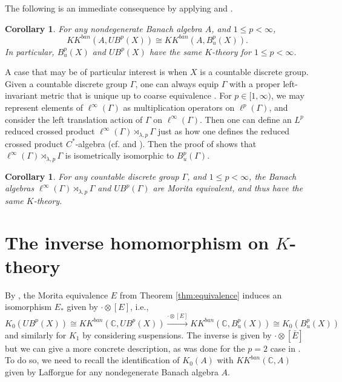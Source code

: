 \documentclass[a4,11pt]{amsart}
\newtheorem{cor}[thm]{Corollary}
\theoremstyle{remark}
\begin{document}
The following is an immediate consequence by applying \cite[Theorem 5.29]{Par09} and \cite[Th\'{e}or\`{e}me 1.2.8]{Laf02}.

\begin{cor} \label{cor:K}
For any nondegenerate Banach algebra $A$, and $1\leq p<\infty$, \[ KK^{ban}(A,UB^p(X))\cong KK^{ban}(A,B^p_u(X)). \]
In particular, $B^p_u(X)$ and $UB^p(X)$ have the same $K$-theory for $1\leq p<\infty$. 
\end{cor}

A case that may be of particular interest is when $X$ is a countable discrete group.
Given a countable discrete group $\Gamma$, one can always equip $\Gamma$ with a proper left-invariant metric that is unique up to coarse equivalence \cite[Lemma 2.1]{Tu01}.
For $p\in[1,\infty)$, we may represent elements of $\ell^\infty(\Gamma)$ as multiplication operators on $\ell^p(\Gamma)$, and consider the left translation action of $\Gamma$ on $\ell^\infty(\Gamma)$. Then one can define an $L^p$ reduced crossed product $\ell^\infty(\Gamma)\rtimes_{\lambda,p}\Gamma$ just as how one defines the reduced crossed product $C^\ast$-algebra (cf. \cite[Definition 4.1.4]{BO} and \cite[Remark 2.7]{Chung21}). Then the proof of \cite[Proposition 5.1.3]{BO} shows that $\ell^\infty(\Gamma)\rtimes_{\lambda,p}\Gamma$ is isometrically isomorphic to $B^p_u(\Gamma)$.

\begin{cor} \label{cor:group}
For any countable discrete group $\Gamma$, and $1\leq p<\infty$, the Banach algebras $\ell^\infty(\Gamma)\rtimes_{\lambda,p}\Gamma$ and $UB^p(\Gamma)$ are Morita equivalent, and thus have the same $K$-theory.
\end{cor}


\section{The inverse homomorphism on $K$-theory} \label{sect:inv}

By \cite[Theorem 5.29]{Par09}, the Morita equivalence $E$ from Theorem \ref{thm:equivalence} induces an isomorphism $E_*$ given by $\cdot\otimes[E]$, i.e.,
\[ K_0(UB^p(X))\cong KK^{ban}(\mathbb{C},UB^p(X)) \stackrel{\cdot\otimes[E]}{\rightarrow} KK^{ban}(\mathbb{C},B^p_u(X))\cong K_0(B^p_u(X)) \]
and similarly for $K_1$ by considering suspensions. 
The inverse is given by $\cdot\otimes[\bar{E}]$ but we can give a more concrete description, as was done for the $p=2$ case in \cite[Proposition 4.8]{SW13}.
To do so, we need to recall the identification of $K_0(A)$ with $KK^{ban}(\mathbb{C},A)$ given by Lafforgue \cite[Th\'{e}or\`{e}me 1.2.8]{Laf02} for any nondegenerate Banach algebra $A$.
\end{document}
